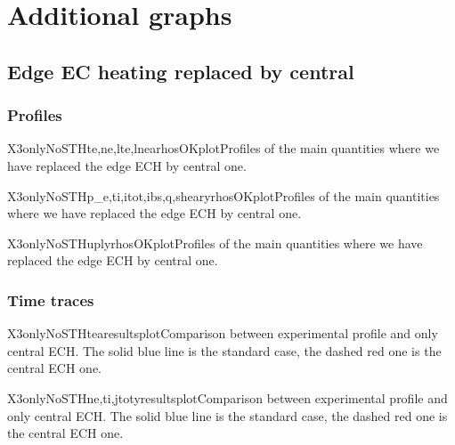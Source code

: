 \chapter{Additional graphs}\label{sec:app:graphs}\thispagestyle{fancy}
\section{Edge EC heating replaced by central}\label{sec:app:graphs:recovery:X3only}
\subsection{Profiles}\label{sec:app:graphs:recovery:X3only:profs}
\begin{AllFigs}{X3onlyNoST}{H}{}{te,ne,lte,lne}{a}{rhosOKplot}{Profiles of the main quantities where we have replaced the edge ECH by central one.}
\end{AllFigs}

\begin{AllFigs}{X3onlyNoST}{H}{}{p_e,ti,itot,ibs,q,shear}{y}{rhosOKplot}{Profiles of the main quantities where we have replaced the edge ECH by central one.}
\end{AllFigs}

\begin{AllFigs}{X3onlyNoST}{H}{}{upl}{y}{rhosOKplot}{Profiles of the main quantities where we have replaced the edge ECH by central one.}
\end{AllFigs}

\subsection{Time traces}\label{sec:app:graphs:recovery:X3only:traces}
\begin{AllFigs}{X3onlyNoST}{H}{}{te}{a}{resultsplot}{Comparison between experimental profile and only central ECH. The solid blue line is the standard case, the dashed red one is the central ECH one.}
\end{AllFigs}

\begin{AllFigs}{X3onlyNoST}{H}{}{ne,ti,jtot}{y}{resultsplot}{Comparison between experimental profile and only central ECH. The solid blue line is the standard case, the dashed red one is the central ECH one.}
\end{AllFigs}

